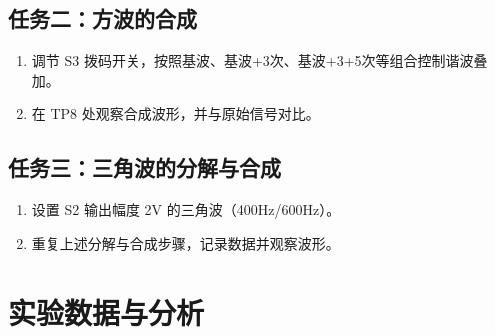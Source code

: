 \documentclass[12pt, a4paper]{ctexrep}
\begin{document}
\subsection{任务二：方波的合成}
\begin{enumerate}
    \item 调节 S3 拨码开关，按照基波、基波+3次、基波+3+5次等组合控制谐波叠加。
    \item 在 TP8 处观察合成波形，并与原始信号对比。
\end{enumerate}
\subsection{任务三：三角波的分解与合成}
\begin{enumerate}
    \item 设置 S2 输出幅度 2V 的三角波（400Hz/600Hz）。
    \item 重复上述分解与合成步骤，记录数据并观察波形。
\end{enumerate}
\section{实验数据与分析}
\end{document}
